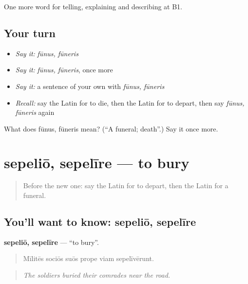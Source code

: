 \begin{grammarlens}[title={What you've built}]
One more word for telling, explaining and describing at B1.
\end{grammarlens}

\subsection*{Your turn}
\begin{itemize}
\raggedright
  \item \emph{Say it:} \emph{fūnus, fūneris}
  \item \emph{Say it:} \emph{fūnus, fūneris}, once more
  \item \emph{Say it:} a sentence of your own with \emph{fūnus, fūneris}
  \item \emph{Recall:} say the Latin for to die, then the Latin for to depart, then say \emph{fūnus, fūneris} again
\end{itemize}

\begin{tcolorbox}[breakable,colback=teal!4,colframe=teal!35!black,title={Before you move on}]
What does fūnus, fūneris mean? (\textquotedblleft{}A funeral; death\textquotedblright{}.) Say it once more.
\end{tcolorbox}
\section[sepeliō, sepelīre]{sepeliō, sepelīre — to bury}

\label{lesson:LA-C330-sepelio}



\begin{quote}
Before the new one: say the Latin for to depart, then the Latin for a funeral.
\end{quote}

\subsection*{You'll want to know: sepeliō, sepelīre}
\textbf{sepeliō, sepelīre} — \textquotedblleft{}to bury\textquotedblright{}.

\begin{quote}
Mīlitēs sociōs suōs prope viam sepelīvērunt.
\end{quote}

\begin{quote}
\emph{The soldiers buried their comrades near the road.}
\end{quote}

